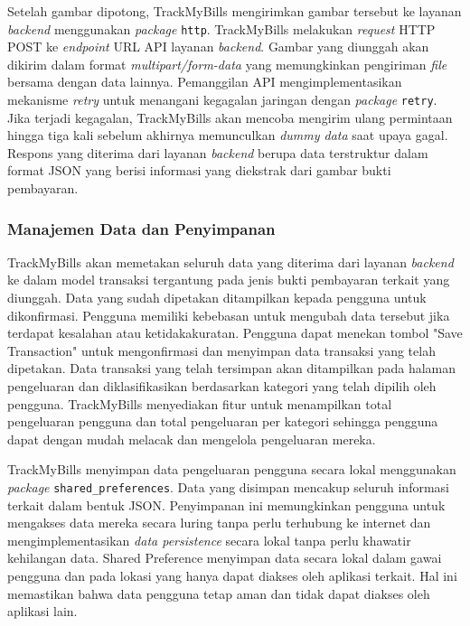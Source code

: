 Setelah gambar dipotong, TrackMyBills mengirimkan gambar tersebut ke layanan \emph{backend} menggunakan \emph{package} \texttt{http}. TrackMyBills melakukan \emph{request} HTTP POST ke \emph{endpoint} URL API layanan \emph{backend}. Gambar yang diunggah akan dikirim dalam format \emph{multipart/form-data} yang memungkinkan pengiriman \emph{file} bersama dengan data lainnya. Pemanggilan API mengimplementasikan mekanisme \emph{retry} untuk menangani kegagalan jaringan dengan \emph{package} \texttt{retry}. Jika terjadi kegagalan, TrackMyBills akan mencoba mengirim ulang permintaan hingga tiga kali sebelum akhirnya memunculkan \emph{dummy data} saat upaya gagal. Respons yang diterima dari layanan \emph{backend} berupa data terstruktur dalam format JSON yang berisi informasi yang diekstrak dari gambar bukti pembayaran.

\subsubsection{Manajemen Data dan Penyimpanan}
\label{subsubsec:manajemen-data-dan-penyimpanan}

TrackMyBills akan memetakan seluruh data yang diterima dari layanan \emph{backend} ke dalam model transaksi tergantung pada jenis bukti pembayaran terkait yang diunggah. Data yang sudah dipetakan ditampilkan kepada pengguna untuk dikonfirmasi. Pengguna memiliki kebebasan untuk mengubah data tersebut jika terdapat kesalahan atau ketidakakuratan. Pengguna dapat menekan tombol "Save Transaction" untuk mengonfirmasi dan menyimpan data transaksi yang telah dipetakan. Data transaksi yang telah tersimpan akan ditampilkan pada halaman pengeluaran dan diklasifikasikan berdasarkan kategori yang telah dipilih oleh pengguna. TrackMyBills menyediakan fitur untuk menampilkan total pengeluaran pengguna dan total pengeluaran per kategori sehingga pengguna dapat dengan mudah melacak dan mengelola pengeluaran mereka.

TrackMyBills menyimpan data pengeluaran pengguna secara lokal menggunakan \emph{package} \texttt{shared\_preferences}. Data yang disimpan mencakup seluruh informasi terkait dalam bentuk JSON. Penyimpanan ini memungkinkan pengguna untuk mengakses data mereka secara luring tanpa perlu terhubung ke internet dan mengimplementasikan \emph{data persistence} secara lokal tanpa perlu khawatir kehilangan data. Shared Preference menyimpan data secara lokal dalam gawai pengguna dan pada lokasi yang hanya dapat diakses oleh aplikasi terkait. Hal ini memastikan bahwa data pengguna tetap aman dan tidak dapat diakses oleh aplikasi lain.

